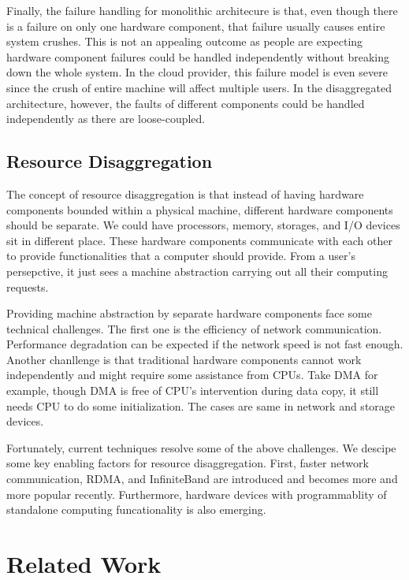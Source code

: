 \documentclass[twocolumn]{article}
\begin{document}
Finally, the failure handling for monolithic architecure is that, even though there is a failure on only one hardware component, that failure usually causes entire system crushes. This is not an appealing outcome as people are expecting hardware component failures could be handled independently without breaking down the whole system. In the cloud provider, this failure model is even severe since the crush of entire machine will affect multiple users. In the disaggregated architecture, however, the faults of different components could be handled independently as there are loose-coupled.

\subsection{Resource Disaggregation}

The concept of resource disaggregation is that instead of having hardware components bounded within a physical machine, different hardware components should be separate. We could have processors, memory, storages, and I/O devices sit in different place. These hardware components communicate with each other to provide functionalities that a computer should provide. From a user's persepctive, it just sees a machine abstraction carrying out all their computing requests. 

Providing machine abstraction by separate hardware components face some technical challenges\cite{Rack_scale_challenges}. The first one is the efficiency of network communication. Performance degradation can be expected if the network speed is not fast enough. Another chanllenge is that traditional hardware components cannot work independently and might require some assistance from CPUs. Take DMA for example, though DMA is free of CPU's intervention during data copy, it still needs CPU to do some initialization. The cases are same in network and storage devices.

Fortunately, current techniques resolve some of the above challenges. We descipe some key enabling factors for resource disaggregation. First, faster network communication\cite{R2C2}, RDMA\cite{RDMA}, and InfiniteBand\cite{InfiniteBand} are introduced and becomes more and more popular recently. Furthermore, hardware devices with programmablity of standalone computing funcationality is also emerging\cite{PARDIS, PIM}.

\section{Related Work}
\end{document}
